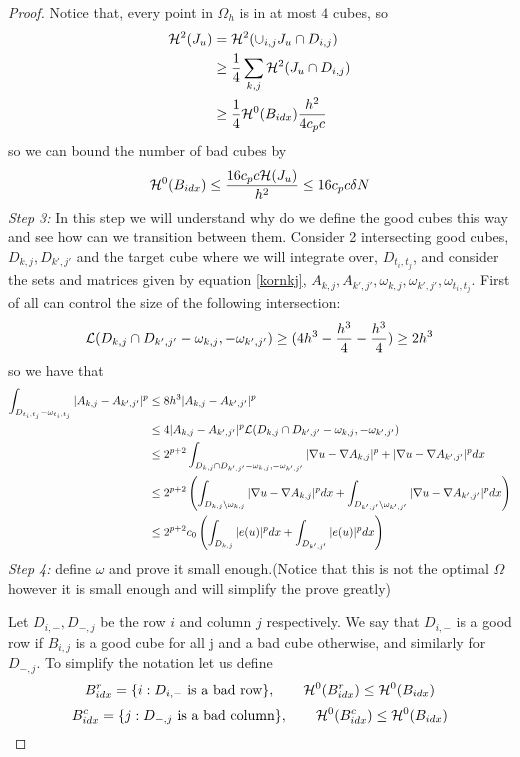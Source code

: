 \begin{proof}
    Notice that, every point in $\Omega_h$ is in at most $4$ cubes, so
    \begin{align*}
        {\mathcal H}^2(J_u)&= {\mathcal H}^2(\cup_{i,j}J_u\cap D_{i,j})\\
        &\geq \frac{1}{4}\sum_{k,j}{\mathcal H}^2(J_u\cap D_{i,j})\\
        &\geq\frac{1}{4}{\mathcal H}^0(B_{idx})\frac{h^2}{4c_pc}
    \end{align*}
    so we can bound the number of bad cubes by
    $${\mathcal H}^0(B_{idx})\leq\frac{16 c_p c {\mathcal H}(J_u)}{h^2}\leq 16 c_p c \delta N $$
    \textit{Step 3:} In this step we will understand why do we define the good cubes this way and 
     see how can we transition between them. Consider 2 intersecting good cubes, $D_{k,j},D_{k',j'}$ and the target cube where we will integrate over, $D_{t_i,t_j}$, and consider the sets and matrices given by equation \ref{kornkj}, $A_{k,j},A_{k',j'},\omega_{k,j},\omega_{k',j'},\omega_{t_i,t_j}$. First of all 
     can control the size of the following intersection:
     $${\mathcal L}(D_{k,j}\cap D_{k',j'}-\omega_{k,j},-\omega_{k',j'})\geq (4h^3-\frac{h^3}{4}-\frac{h^3}{4})\geq 2h^3$$
     so  we have that 
    \begin{align*}
    \int_{D_{t_i,t_j}-\omega_{t_i,t_j}}|A_{k,j}-A_{k',j'}|^p & \leq 8h^3 |A_{k,j}-A_{k',j'}|^p\\
    &\leq 4|A_{k,j}-A_{k',j'}|^p {\mathcal L}(D_{k,j}\cap D_{k',j'}-\omega_{k,j},-\omega_{k',j'})\\
    &\leq 2^{p+2}\int_{D_{k,j}\cap D_{k',j'}-\omega_{k,j},-\omega_{k',j'}}|\nabla u-\nabla A_{k,j}|^p+|\nabla u-\nabla A_{k',j'}|^p dx\\
    & \leq 2^{p+2}\left(\int_{D_{k,j} \backslash \omega_{k,j}}|\nabla u-\nabla A_{k,j}|^p d x + \int_{D_{k',j'} \backslash \omega_{k',j'}}|\nabla u-\nabla A_{k',j'}|^p d x\right)\\
    &\leq 2^{p+2}c_0\left(\int_{D_{k,j}}|e(u)|^p dx+\int_{D_{k',j'}}|e(u)|^p dx \right)
    \end{align*}
     \textit{Step 4:}
     define $\omega$ and prove it small enough.(Notice that this is not the optimal $\Omega$ however it is small enough and will simplify the prove greatly)
    
    Let $D_{i,-}, D_{-,j}$ be the row $i$ and column $j$ respectively. We say that $D_{i,-}$ is a good row if $B_{i,j}$ is a good cube for all j and a bad cube otherwise, and similarly for $D_{-,j}$. To simplify the notation let us define
    $$B^r_{idx}=\{i: D_{i,-}\text{ is a bad row}\}, \qquad {\mathcal H}^0(B^r_{idx})\leq {\mathcal H}^0(B_{idx}) $$
    $$B^c_{idx}=\{j: D_{-,j}\text{ is a bad column}\},\qquad {\mathcal H}^0(B^c_{idx})\leq {\mathcal H}^0(B_{idx})  $$
    

\end{proof}
